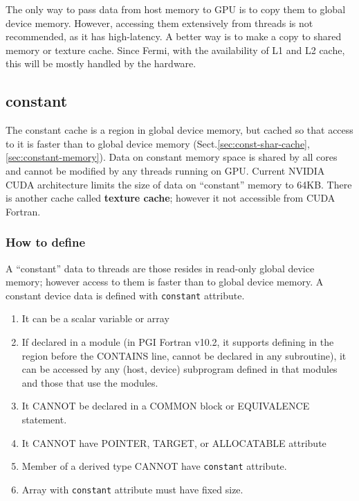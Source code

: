 The only way to pass data from host memory to GPU is to copy them to
global device memory. However, accessing them extensively from threads
is not recommended, as it has high-latency. A better way is to make a
copy to shared memory or texture cache. Since Fermi, with the
availability of L1 and L2 cache, this will be mostly handled by the
hardware. 

\subsection{constant}
\label{sec:cudaf_constant}

The constant cache is a region in global device memory, but cached so
that access to it is faster than to global device memory
(Sect.\ref{sec:const-shar-cache}, \ref{sec:constant-memory}).
Data on constant memory space is shared by all cores and cannot be modified by
any threads running on GPU. Current NVIDIA CUDA architecture limits
the size of data on ``constant'' memory to 64KB.  There is another
cache called {\bf texture cache}; however it not accessible from CUDA
Fortran.

\subsubsection{How to define}
\label{sec:how-define-2}

A ``constant'' data to threads are those resides in read-only global
device memory; however access to them is faster than to global device
memory. A constant device data is defined with
\verb.constant. attribute.

\begin{enumerate}
\item It can be a scalar variable or array
\item If declared in a module (in PGI Fortran v10.2, it supports
  defining in the region before the CONTAINS line, cannot be
  declared in any subroutine), it can be accessed by any (host,
  device) subprogram defined in that modules and those that use the
  modules.
\item It CANNOT be declared in a COMMON block or EQUIVALENCE
  statement.
\item It CANNOT have POINTER, TARGET, or  ALLOCATABLE attribute
\item Member of a derived type CANNOT have \verb!constant! attribute.
\item Array with \verb!constant! attribute must have fixed size.
\end{enumerate}

